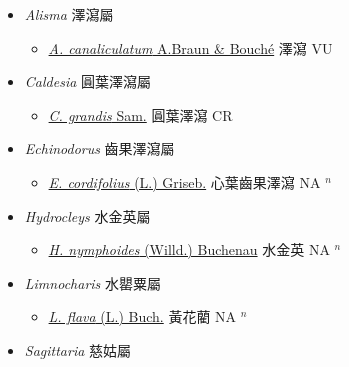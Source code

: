 
  \begin{itemize}
 \item[] \textit{Alisma} 澤瀉屬
                    
  \begin{itemize}
        \item[] \href{http://www.theplantlist.org/tpl1.1/search?q=Alisma+canaliculatum}{\textit{A. canaliculatum} A.Braun \& Bouché}   澤瀉 VU
  \end{itemize}
 \item[] \textit{Caldesia} 圓葉澤瀉屬
                    
  \begin{itemize}
        \item[] \href{http://www.theplantlist.org/tpl1.1/search?q=Caldesia+grandis}{\textit{C. grandis} Sam.}   圓葉澤瀉 CR
  \end{itemize}
 \item[] \textit{Echinodorus} 齒果澤瀉屬
                    
  \begin{itemize}
        \item[] \href{http://www.theplantlist.org/tpl1.1/search?q=Echinodorus+cordifolius}{\textit{E. cordifolius} (L.) Griseb.}   心葉齒果澤瀉 NA $^n$
  \end{itemize}
 \item[] \textit{Hydrocleys} 水金英屬
                    
  \begin{itemize}
        \item[] \href{http://www.theplantlist.org/tpl1.1/search?q=Hydrocleys+nymphoides}{\textit{H. nymphoides} (Willd.) Buchenau}   水金英 NA $^n$
  \end{itemize}
 \item[] \textit{Limnocharis} 水罌粟屬
                    
  \begin{itemize}
        \item[] \href{http://www.theplantlist.org/tpl1.1/search?q=Limnocharis+flava}{\textit{L. flava} (L.) Buch.}   黃花藺 NA $^n$
  \end{itemize}
 \item[] \textit{Sagittaria} 慈姑屬
                    

\end{itemize}

